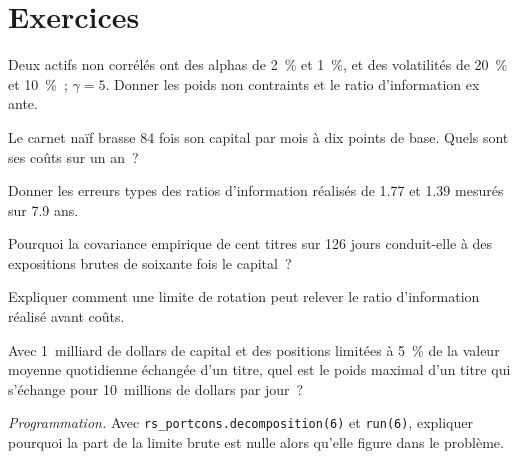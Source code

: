 \section{Exercices}

\begin{exercise}[$\star$]\label{exo:rs:portfolio-construction-i:1}
Deux actifs non corrélés ont des alphas de 2~\% et 1~\%, et des volatilités de 20~\% et 10~\%~; $\gamma = 5$. Donner les poids non contraints et le ratio d'information ex ante.
\end{exercise}

\begin{exercise}[$\star$]\label{exo:rs:portfolio-construction-i:2}
Le carnet naïf brasse 84 fois son capital par mois à dix points de base. Quels sont ses coûts sur un an~?
\end{exercise}

\begin{exercise}[$\star$]\label{exo:rs:portfolio-construction-i:3}
Donner les erreurs types des ratios d'information réalisés de 1.77 et 1.39 mesurés sur 7.9 ans.
\end{exercise}

\begin{exercise}[$\star\star$]\label{exo:rs:portfolio-construction-i:4}
Pourquoi la covariance empirique de cent titres sur 126 jours conduit-elle à des expositions brutes de soixante fois le capital~?
\end{exercise}

\begin{exercise}[$\star\star$]\label{exo:rs:portfolio-construction-i:5}
Expliquer comment une limite de rotation peut relever le ratio d'information réalisé avant coûts.
\end{exercise}

\begin{exercise}[$\star\star$]\label{exo:rs:portfolio-construction-i:6}
Avec 1~milliard de dollars de capital et des positions limitées à 5~\% de la valeur moyenne quotidienne échangée d'un titre, quel est le poids maximal d'un titre qui s'échange pour 10~millions de dollars
par jour~?
\end{exercise}

\begin{exercise}[$\star\star\star$]\label{exo:rs:portfolio-construction-i:7}
\emph{Programmation.} Avec \texttt{rs\_portcons.decomposition(6)} et \texttt{run(6)}, expliquer pourquoi la part de la limite brute est nulle alors qu'elle figure dans le problème.
\end{exercise}

